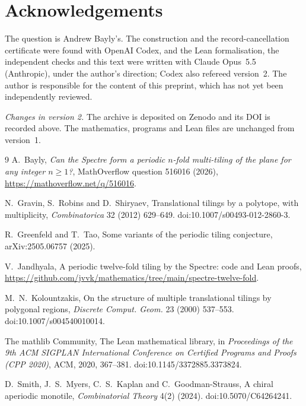 \documentclass[11pt]{amsart}
\theoremstyle{remark}
\begin{document}
\section*{Acknowledgements}
The question is Andrew Bayly's. The construction and the record-cancellation certificate were found with
OpenAI Codex, and the Lean formalisation, the independent checks and this text were written with Claude
Opus~5.5 (Anthropic), under the author's direction; Codex also refereed version~2. The author is responsible
for the content of this preprint, which has not yet been independently reviewed.

\emph{Changes in version 2.} The archive is deposited on Zenodo and its DOI is recorded above. The
mathematics, programs and Lean files are unchanged from version~1.

\begin{thebibliography}{9}
 A.~Bayly, \emph{Can the Spectre form a periodic $n$-fold multi-tiling of the plane for any
integer $n\ge1$?}, MathOverflow question 516016 (2026), \url{https://mathoverflow.net/q/516016}.

 N.~Gravin, S.~Robins and D.~Shiryaev, Translational tilings by a polytope, with multiplicity,
\emph{Combinatorica} 32 (2012) 629--649. doi:10.1007/s00493-012-2860-3.

 R.~Greenfeld and T.~Tao, Some variants of the periodic tiling conjecture, arXiv:2505.06757
(2025).

 V.~Jandhyala, A periodic twelve-fold tiling by the Spectre: code and Lean proofs,
\url{https://github.com/jvvk/mathematics/tree/main/spectre-twelve-fold}.

 M.~N.~Kolountzakis, On the structure of multiple translational tilings by polygonal regions,
\emph{Discrete Comput. Geom.} 23 (2000) 537--553. doi:10.1007/s004540010014.

 The mathlib Community, The Lean mathematical library, in \emph{Proceedings of the 9th ACM
SIGPLAN International Conference on Certified Programs and Proofs (CPP 2020)}, ACM, 2020, 367--381.
doi:10.1145/3372885.3373824.

 D.~Smith, J.~S.~Myers, C.~S.~Kaplan and C.~Goodman-Strauss, A chiral aperiodic monotile,
\emph{Combinatorial Theory} 4(2) (2024). doi:10.5070/C64264241.
\end{thebibliography}
\end{document}

